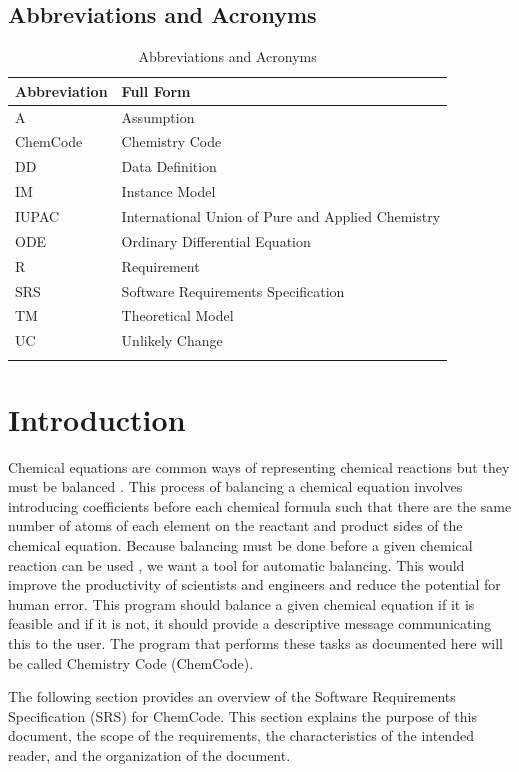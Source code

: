 \documentclass[12pt]{article}
\begin{document}
\subsection{Abbreviations and Acronyms}
\label{Sec:TAbbAcc}
\begin{longtable}{l l}
\toprule
\textbf{Abbreviation} & \textbf{Full Form}
\\
\midrule
\endhead
A & Assumption
\\
ChemCode & Chemistry Code
\\
DD & Data Definition
\\
IM & Instance Model
\\
IUPAC & International Union of Pure and Applied Chemistry
\\
ODE & Ordinary Differential Equation
\\
R & Requirement
\\
SRS & Software Requirements Specification
\\
TM & Theoretical Model
\\
UC & Unlikely Change
\\
\bottomrule
\caption{Abbreviations and Acronyms}
\label{Table:TAbbAcc}
\end{longtable}
\section{Introduction}
\label{Sec:Intro}
Chemical equations are common ways of representing chemical reactions but they must be balanced \cite{lund2023}. This process of balancing a chemical equation involves introducing coefficients before each chemical formula such that there are the same number of atoms of each element on the reactant and product sides of the chemical equation. Because balancing must be done before a given chemical reaction can be used \cite{lund2023}, we want a tool for automatic balancing. This would improve the productivity of scientists and engineers and reduce the potential for human error. This program should balance a given chemical equation if it is feasible and if it is not, it should provide a descriptive message communicating this to the user. The program that performs these tasks as documented here will be called Chemistry Code (ChemCode).

The following section provides an overview of the Software Requirements Specification (SRS) for ChemCode. This section explains the purpose of this document, the scope of the requirements, the characteristics of the intended reader, and the organization of the document.
\end{document}
